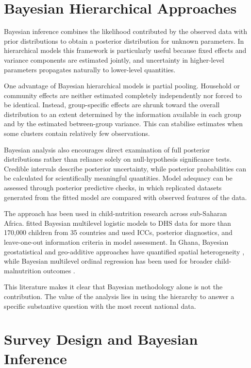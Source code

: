\section{Bayesian Hierarchical Approaches}

Bayesian inference combines the likelihood contributed by the observed data with prior distributions to obtain a posterior distribution for unknown parameters. In hierarchical models this framework is particularly useful because fixed effects and variance components are estimated jointly, and uncertainty in higher-level parameters propagates naturally to lower-level quantities.

One advantage of Bayesian hierarchical models is partial pooling. Household or community effects are neither estimated completely independently nor forced to be identical. Instead, group-specific effects are shrunk toward the overall distribution to an extent determined by the information available in each group and by the estimated between-group variance. This can stabilise estimates when some clusters contain relatively few observations.

Bayesian analysis also encourages direct examination of full posterior distributions rather than reliance solely on null-hypothesis significance tests. Credible intervals describe posterior uncertainty, while posterior probabilities can be calculated for scientifically meaningful quantities. Model adequacy can be assessed through posterior predictive checks, in which replicated datasets generated from the fitted model are compared with observed features of the data.

The approach has been used in child-nutrition research across sub-Saharan Africa. \citet{TakeleEtAl2022} fitted Bayesian multilevel logistic models to DHS data for more than 170,000 children from 35 countries and used ICCs, posterior diagnostics, and leave-one-out information criteria in model assessment. In Ghana, Bayesian geostatistical and geo-additive approaches have quantified spatial heterogeneity \cite{AhetoDagne2021,AmoakoJohnson2022}, while Bayesian multilevel ordinal regression has been used for broader child-malnutrition outcomes \cite{IddrisuGyabaah2023}.

This literature makes it clear that Bayesian methodology alone is not the contribution. The value of the analysis lies in using the hierarchy to answer a specific substantive question with the most recent national data.

\section{Survey Design and Bayesian Inference}

